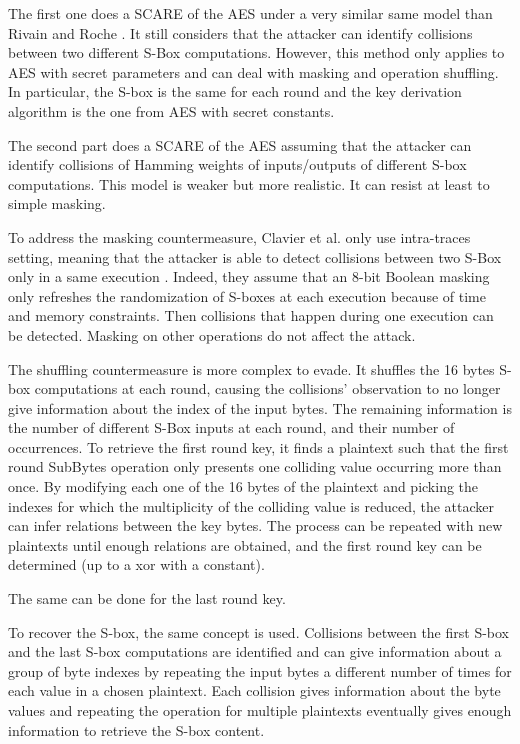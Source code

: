 \documentclass[11pt]{sdm}
\begin{document}
The first one does a SCARE of the AES under a very similar same model than Rivain and Roche \parencite{Rivain_Roche_2013}.
It still considers that the attacker can identify collisions between two different S-Box computations.
However, this method only applies to AES with secret parameters and can deal with masking and operation shuffling.
In particular, the S-box is the same for each round and the key derivation algorithm is the one from AES with secret constants.

The second part does a SCARE of the AES assuming that the attacker can identify collisions of Hamming weights of inputs/outputs of different S-box computations.
This model is weaker but more realistic.
It can resist at least to simple masking.

\smallbreak
To address the masking countermeasure, Clavier et al. only use intra-traces setting, meaning that the attacker is able to detect collisions between two S-Box only in a same execution \parencite{Clavier_Isorez_Marion_Wurcker_2015}.
Indeed, they assume that an 8-bit Boolean masking only refreshes the randomization of S-boxes at each execution because of time and memory constraints.
Then collisions that happen during one execution can be detected.
Masking on other operations do not affect the attack.

The shuffling countermeasure is more complex to evade.
It shuffles the 16 bytes S-box computations at each round, causing the collisions' observation to no longer give information about the index of the input bytes.
The remaining information is the number of different S-Box inputs at each round, and their number of occurrences.
To retrieve the first round key, it finds a plaintext such that the first round SubBytes operation only presents one colliding value occurring more than once.
By modifying each one of the 16 bytes of the plaintext and picking the indexes for which the multiplicity of the colliding value is reduced, the attacker can infer relations between the key bytes.
The process can be repeated with new plaintexts until enough relations are obtained, and the first round key can be determined (up to a xor with a constant).

The same can be done for the last round key.

To recover the S-box, the same concept is used.
Collisions between the first S-box and the last S-box computations are identified and can give information about a group of byte indexes by repeating the input bytes a different number of times for each value in a chosen plaintext.
Each collision gives information about the byte values and repeating the operation for multiple plaintexts eventually gives enough information to retrieve the S-box content.
\end{document}
